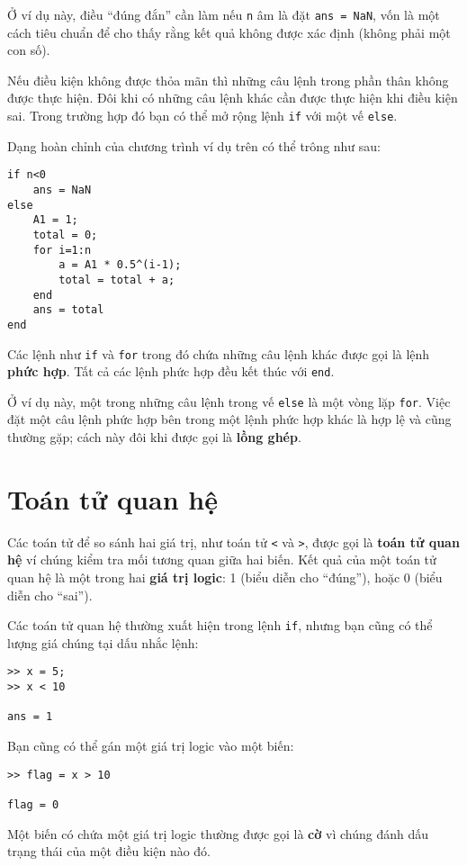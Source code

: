 \documentclass[12pt]{book}
\begin{document}
Ở ví dụ này, điều ``đúng đắn'' cần làm nếu {\tt n} âm là đặt
{\tt ans = NaN}, vốn là một cách tiêu chuẩn để cho thấy rằng
kết quả không được xác định (không phải một con số).

Nếu điều kiện không được thỏa mãn thì những câu lệnh trong phần thân
không được thực hiện. Đôi khi có những câu lệnh khác cần được
thực hiện khi điều kiện sai. Trong trường hợp đó bạn có thể
mở rộng lệnh {\tt if} với một vế {\tt else}.

Dạng hoàn chỉnh của chương trình ví dụ trên có thể trông như sau:

\begin{verbatim}
if n<0
    ans = NaN
else
    A1 = 1;
    total = 0;
    for i=1:n
        a = A1 * 0.5^(i-1);
        total = total + a;
    end
    ans = total
end
\end{verbatim}
%
Các lệnh như {\tt if} và {\tt for} trong đó chứa những câu lệnh khác
được gọi là lệnh {\bf phức hợp}. Tất cả các lệnh phức hợp đều 
kết thúc với {\tt end}.

Ở ví dụ này, một trong những câu lệnh trong vế {\tt else} là một 
vòng lặp {\tt for}. Việc đặt một câu lệnh phức hợp bên trong một
lệnh phức hợp khác là hợp lệ và cũng thường gặp; cách này đôi
khi được gọi là {\bf lồng ghép}.


\section{Toán tử quan hệ}

Các toán tử để so sánh hai giá trị, như toán tử {\tt <} và 
{\tt >}, được gọi là {\bf toán tử quan hệ} ví chúng kiểm tra 
mối tương quan giữa hai biến. Kết quả của một toán tử quan hệ
là một trong hai {\bf giá trị logic}: 1 (biểu diễn cho ``đúng''),
hoặc 0 (biểu diễn cho ``sai'').

Các toán tử quan hệ thường xuất hiện trong lệnh {\tt if},
nhưng bạn cũng có thể lượng giá chúng tại dấu nhắc lệnh:

\begin{verbatim}
>> x = 5;
>> x < 10

ans = 1
\end{verbatim}

Bạn cũng có thể gán một giá trị logic vào một biến:

\begin{verbatim}
>> flag = x > 10

flag = 0
\end{verbatim}

Một biến có chứa một giá trị logic thường được gọi là {\bf cờ}
vì chúng đánh dấu trạng thái của một điều kiện nào đó.
\end{document}
